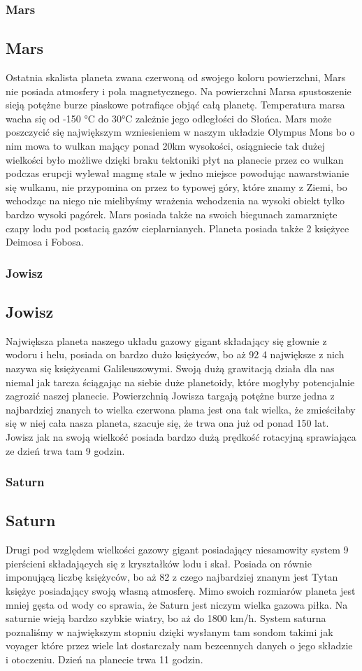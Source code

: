 \begin{frame}
\frametitle{Mars}
\subsection{Mars}
Ostatnia skalista planeta zwana czerwoną od swojego koloru powierzchni, Mars nie posiada atmosfery i pola magnetycznego. Na powierzchni Marsa spustoszenie sieją potężne burze piaskowe potrafiące objąć całą planetę. Temperatura marsa wacha się od -150 °C do 30°C zależnie jego odległości do Słońca. Mars może poszczycić się największym wzniesieniem w naszym układzie Olympus Mons bo o nim mowa to wulkan mający ponad 20km wysokości, osiągniecie tak dużej wielkości było możliwe dzięki braku tektoniki płyt na planecie przez co wulkan podczas erupcji wylewał magmę stale w jedno miejsce powodując nawarstwianie się wulkanu, nie przypomina on przez to typowej góry, które znamy z Ziemi, bo wchodząc na niego nie mielibyśmy wrażenia wchodzenia na wysoki obiekt tylko bardzo wysoki pagórek. Mars posiada także na swoich biegunach zamarznięte czapy lodu pod postacią gazów cieplarnianych. Planeta posiada także 2 księżyce Deimosa i Fobosa.
\end{frame}


\begin{frame}
\frametitle{Jowisz}
\subsection{Jowisz}
Największa planeta naszego układu gazowy gigant składający się głownie z wodoru i helu, posiada on bardzo dużo księżyców, bo aż 92 4 największe z nich nazywa się księżycami Galileuszowymi. Swoją dużą grawitacją działa dla nas niemal jak tarcza ściągając na siebie duże planetoidy, które mogłyby potencjalnie zagrozić naszej planecie. Powierzchnią Jowisza targają potężne burze jedna z najbardziej znanych to wielka czerwona plama jest ona tak wielka, że zmieściłaby się w niej cała nasza planeta, szacuje się, że trwa ona już od ponad 150 lat. Jowisz jak na swoją wielkość posiada bardzo dużą prędkość rotacyjną sprawiająca ze dzień trwa tam 9 godzin.
\end{frame}


\begin{frame}
\frametitle{Saturn}
\subsection{Saturn}
Drugi pod względem wielkości gazowy gigant posiadający niesamowity system 9 pierścieni składających się z kryształków lodu i skał. Posiada on równie imponującą liczbę księżyców, bo aż 82 z czego najbardziej znanym jest Tytan księżyc posiadający swoją własną atmosferę. Mimo swoich rozmiarów planeta jest mniej gęsta od wody co sprawia, że Saturn jest niczym wielka gazowa piłka. Na saturnie wieją bardzo szybkie wiatry, bo aż do 1800 km/h. System saturna poznaliśmy w największym stopniu dzięki wysłanym tam sondom takimi jak voyager które przez wiele lat dostarczały nam bezcennych danych o jego składzie i otoczeniu. Dzień na planecie trwa 11 godzin.
\end{frame}


